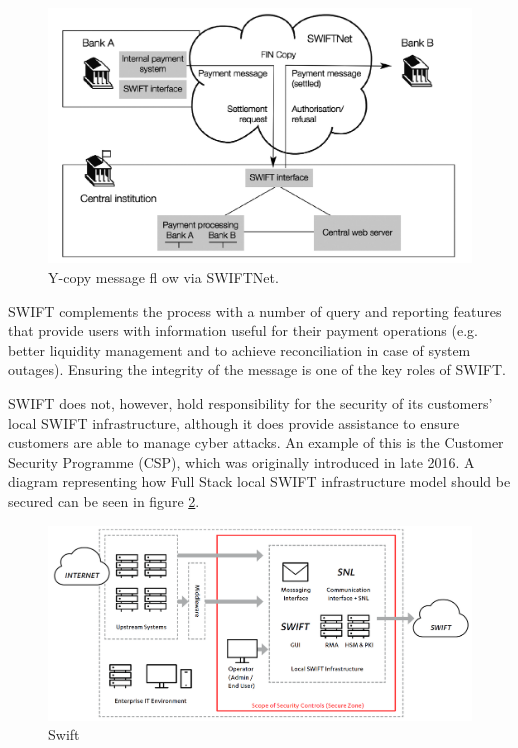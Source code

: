 \documentclass[12pt]{article}
\begin{document}
        \begin{figure}[H]
        \centering
        \includegraphics[width=\textwidth]{figures/swiftcloud.png}
        \caption{Y-copy message fl ow via SWIFTNet.}
        \label{fig:swiftcloud}
        \end{figure}
       
        SWIFT complements the process with a number of query and reporting features that provide users with information useful for their payment operations (e.g. better liquidity management and to achieve reconciliation in case of system outages). Ensuring the integrity of the message is one of the key roles of SWIFT.\cite{scottSocietyWorldwideInterbank2013}
        
        SWIFT does not, however, hold responsibility for the security of its customers’ local SWIFT infrastructure, although it does provide assistance to ensure customers are able to manage cyber attacks. An example of this is the Customer Security Programme (CSP), which was originally introduced in late 2016. A diagram representing how  Full Stack local SWIFT infrastructure model should be secured can be seen in figure \ref{fig:Swift}.
        
        \begin{figure}[H]
        \centering
        \includegraphics[width=\textwidth]{figures/swift.png}
        \caption{Swift}
        \label{fig:Swift}
        \end{figure}
        
\end{document}
